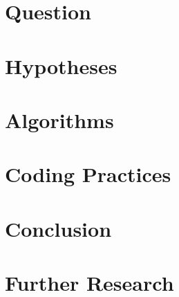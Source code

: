 \documentclass{article}
\begin{document}
\section*{Question\dotfill}
\section*{Hypotheses\dotfill}
\section*{Algorithms\dotfill}
\section*{Coding Practices\dotfill}
\section*{Conclusion\dotfill}
\section*{Further Research\dotfill}

\begin{thebibliography}{1}

\end{thebibliography}
\end{document}
